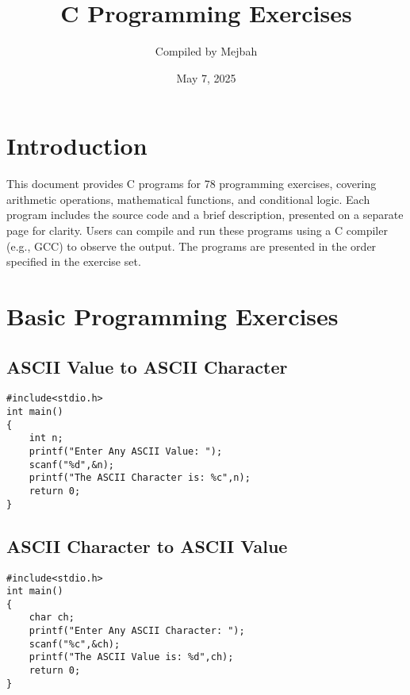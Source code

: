 \documentclass[a4paper,14pt]{article}
\title{C Programming Exercises}
\author{Compiled by Mejbah}
\date{May 7, 2025}
\begin{document}
\maketitle

\tableofcontents

\newpage

\pagestyle{fancy}
\fancyhf{}
\fancyfoot[C]{}

\setcounter{page}{1}

\section{Introduction}
This document provides C programs for 78 programming exercises, covering arithmetic operations, mathematical functions, and conditional logic. Each program includes the source code and a brief description, presented on a separate page for clarity. Users can compile and run these programs using a C compiler (e.g., GCC) to observe the output. The programs are presented in the order specified in the exercise set.
\newpage


\section{Basic Programming Exercises}


\subsection{ASCII Value to ASCII Character}
\vspace{0.5cm}
\begin{lstlisting}[caption={ASCII Value to ASCII Character}]
#include<stdio.h>
int main()
{
    int n;
    printf("Enter Any ASCII Value: ");
    scanf("%d",&n);
    printf("The ASCII Character is: %c",n);
    return 0;
}
\end{lstlisting}
\newpage

\subsection{ASCII Character to ASCII Value}
\vspace{0.5cm}
\begin{lstlisting}[caption={ASCII Character to ASCII Value}]
#include<stdio.h>
int main()
{
    char ch;
    printf("Enter Any ASCII Character: ");
    scanf("%c",&ch);
    printf("The ASCII Value is: %d",ch);
    return 0;
}
\end{lstlisting}
\newpage
\end{document}
